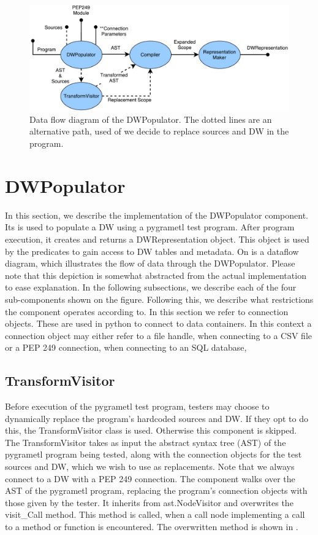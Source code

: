 \begin{figure}
\centering
\includegraphics[width=\textwidth]{figures/reinterpreter.pdf}
\caption{Data flow diagram of the DWPopulator. The dotted lines are an alternative path, used of we decide to replace sources and DW in the program.}
\label{fig:reinterpreter}
\end{figure}
\section{DWPopulator}\label{sec:dwpopulator}

In this section, we describe the implementation of the DWPopulator component. Its is used to populate a DW using a pygrametl test program. After program execution, it creates and returns a DWRepresentation object. This object is used by the predicates to gain access to DW tables and metadata. On  is a dataflow diagram, which illustrates the flow of data through the DWPopulator. Please note that this depiction is somewhat abstracted from the actual implementation to ease explanation. In the following subsections, we describe each of the four sub-components shown on the figure. Following this, we describe what restrictions the component operates according to. In this section we refer to connection objects. These are used in python to connect to data containers. In this context a connection object may either refer to a file handle, when connecting to a CSV file or a PEP 249 connection, when connecting to an SQL database,

\subsection{TransformVisitor}
Before execution of the pygrametl test program, testers may choose to dynamically replace the program's hardcoded sources and DW. If they opt to do this, the TransformVisitor class is used. Otherwise this component is skipped.
The TransformVisitor takes as input the abstract syntax tree (AST) of the pygrametl program being tested, along with the connection objects for the test sources and DW, which we wish to use as replacements. Note that we always connect to a DW with a PEP 249 connection. The component walks over the AST of the pygrametl program, replacing the program's connection objects with those given by the tester. It inherits from ast.NodeVisitor and overwrites the visit\_Call method. This method is called, when a call node implementing a call to a method or function is encountered. The overwritten method is shown in .

